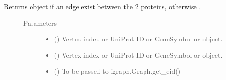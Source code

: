 \documentclass[letterpaper,10pt,english]{sphinxmanual}
\begin{document}
\begin{fulllineitems}
\begin{fulllineitems}
\begin{description}
\end{description}

\end{fulllineitems}


\begin{fulllineitems}
\label{\detokenize{reference:pypath.main.PyPath.protein_edge}}
Returns  object if an edge exist between
the 2 proteins, otherwise .
\begin{quote}\begin{description}
\item[{Parameters}] \leavevmode\begin{itemize}
\item {} 
 (\sphinxstyleliteralemphasis{\sphinxupquote{,}}) \textendash{} Vertex index or UniProt ID or GeneSymbol or 
object.

\item {} 
 (\sphinxstyleliteralemphasis{\sphinxupquote{,}}) \textendash{} Vertex index or UniProt ID or GeneSymbol or 
object.

\item {} 
 () \textendash{} To be passed to igraph.Graph.get\_eid()

\end{itemize}

\end{description}\end{quote}

\end{fulllineitems}


\begin{fulllineitems}
\label{\detokenize{reference:pypath.main.PyPath.proteins}}
\end{fulllineitems}


\end{fulllineitems}
\end{document}
